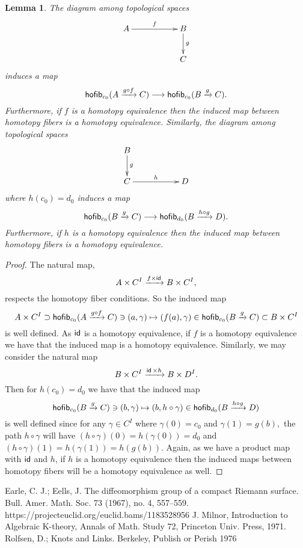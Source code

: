 \documentclass{amsart}
\newtheorem{lemma}[theorem]{Lemma}
\theoremstyle{definition}
\theoremstyle{remark}
\newcommand{\xra}{\xrightarrow}
\DeclareMathOperator{\id}{\sf id}
\begin{document}
\begin{lemma}\label{t70}
The diagram among topological spaces
$$\xymatrix{
A \ar[rr]^-{f} && B \ar[d]^-{g}\\
  &&  C 
}$$
induces a map $${\sf hofib}_{c_{0}}(A \xra{g \circ f} C) \longrightarrow {\sf hofib}_{c_{0}}(B \xra{g} C).$$ Furthermore, if $f$ is a homotopy equivalence then the induced map between homotopy fibers is a homotopy equivalence. Similarly, the diagram among topological spaces
$$\xymatrix{
B \ar[d]^-{g} && \\
C \ar[rr]^-{h} &&  D 
}$$
where $h(c_{0}) =  d_{0}$ induces a map $${\sf hofib}_{c_{0}}(B \xra{g} C) \longrightarrow {\sf hofib}_{d_{0}}(B \xra{h \circ g} D).$$ Furthermore, if $h$ is a homotopy equivalence then the induced map between homotopy fibers is a homotopy equivalence.
\end{lemma}
\begin{proof}
The natural map, $$A \times C^{I} \xra{f \times \id} B \times C^{I},$$ respects the homotopy fiber conditions. So the induced map $$A \times C^{I} \supset {\sf hofib}_{c_{0}}(A \xra{g \circ f} C) \ni (a , \gamma) \mapsto (f(a) , \gamma) \in {\sf hofib}_{c_{0}}(B \xra{g} C) \subset B \times C^{I}$$ is well defined. As $\id$ is a homotopy equivalence, if $f$ is a homotopy equivalence we have that the induced map is a homotopy equivalence. Similarly, we may consider the natural map $$B \times C^{I} \xra{\id \times h} B \times D^{I}.$$ Then for $h(c_{0}) = d_{0}$ we have that the induced map $${\sf hofib}_{c_{0}}(B \xra{g} C) \ni (b, \gamma) \mapsto (b, h \circ \gamma) \in {\sf hofib}_{d_{0}}(B \xra{h \circ g} D)$$ is well defined since for any $\gamma \in C^{I}$ where $\gamma(0) = c_{0}$ and $\gamma(1) = g(b),$ the path $h \circ \gamma$ will have $(h \circ \gamma)(0) = h(\gamma(0)) = d_{0}$ and $(h \circ \gamma)(1) = h(\gamma(1))= h(g(b)).$ Again, as we have a product map with $\id$ and $h$, if $h$ is a homotopy equivalence then the induced maps between homotopy fibers will be a homotopy equivalence as well.
\end{proof}


\begin{thebibliography}{9}
 Earle, C. J.; Eells, J. The diffeomorphism group of a compact Riemann surface. Bull. Amer. Math. Soc. 73 (1967), no. 4, 557--559. https://projecteuclid.org/euclid.bams/1183528956
 J. Milnor, Introduction to Algebraic K-theory, Annals of Math. Study 72,
Princeton Univ. Press, 1971.
 Rolfsen, D.; Knots and Links. Berkeley, Publish or Perish 1976
\end{thebibliography}
\end{document}
